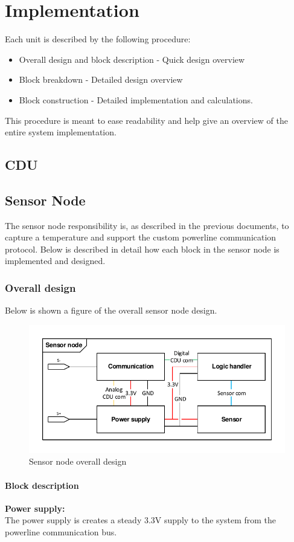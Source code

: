 \chapter{Implementation}
Each unit is described by the following procedure:
\begin{itemize}
\item Overall design and block description - Quick design overview
\item Block breakdown - Detailed design overview
\item Block construction - Detailed implementation and calculations.
\end{itemize}
This procedure is meant to ease readability and help give an overview of the entire system implementation.
\section{CDU}

\section{Sensor Node}
The sensor node responsibility is, as described in the previous documents, to capture a temperature and support the custom powerline communication protocol. Below is described in detail how each block in the sensor node is implemented and designed.

\subsection{Overall design}
Below is shown a figure of the overall sensor node design.
\begin{figure}
\centering
\includegraphics[width=.9\textwidth]{billeder/sn_overall_design}
\caption{Sensor node overall design}
\end{figure}

\subsubsection{Block description}
\textbf{Power supply:}\\
The power supply is creates a steady 3.3V supply to the system from the powerline communication bus.\\

